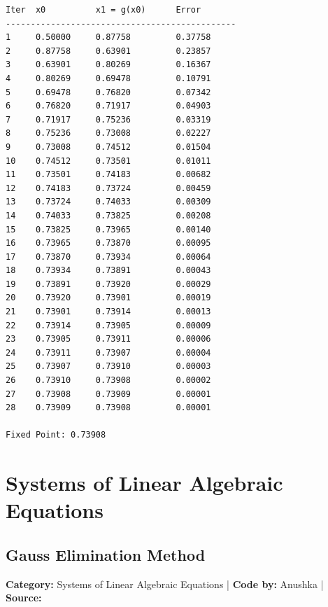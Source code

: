 \documentclass[10pt,a4paper]{report}
\begin{document}
\begin{tcolorbox}[colback=termbg,colframe=primary,title=\textbf{Program Execution Output \& Convergence Table},boxrule=1pt,arc=2mm]
\begin{lstlisting}[style=terminal_output]
Iter  x0          x1 = g(x0)      Error       
----------------------------------------------
1     0.50000     0.87758         0.37758     
2     0.87758     0.63901         0.23857     
3     0.63901     0.80269         0.16367     
4     0.80269     0.69478         0.10791     
5     0.69478     0.76820         0.07342     
6     0.76820     0.71917         0.04903     
7     0.71917     0.75236         0.03319     
8     0.75236     0.73008         0.02227     
9     0.73008     0.74512         0.01504     
10    0.74512     0.73501         0.01011     
11    0.73501     0.74183         0.00682     
12    0.74183     0.73724         0.00459     
13    0.73724     0.74033         0.00309     
14    0.74033     0.73825         0.00208     
15    0.73825     0.73965         0.00140     
16    0.73965     0.73870         0.00095     
17    0.73870     0.73934         0.00064     
18    0.73934     0.73891         0.00043     
19    0.73891     0.73920         0.00029     
20    0.73920     0.73901         0.00019     
21    0.73901     0.73914         0.00013     
22    0.73914     0.73905         0.00009     
23    0.73905     0.73911         0.00006     
24    0.73911     0.73907         0.00004     
25    0.73907     0.73910         0.00003     
26    0.73910     0.73908         0.00002     
27    0.73908     0.73909         0.00001     
28    0.73909     0.73908         0.00001     

Fixed Point: 0.73908
\end{lstlisting}
\end{tcolorbox}

\newpage

\chapter{Systems of Linear Algebraic Equations}

\section{Gauss Elimination Method}
\textbf{Category:} \textcolor{secondary}{Systems of Linear Algebraic Equations} \quad | \quad \textbf{Code by:} \textcolor{secondary}{Anushka} \quad | \quad \textbf{Source:} \texttt{}
\end{document}
